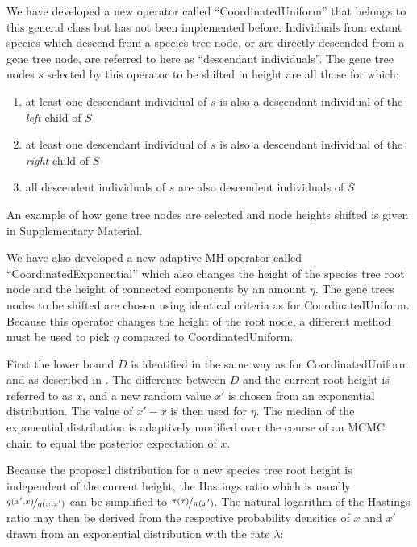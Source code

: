 \documentclass[nogrid]{MBE}%
\begin{document}
We have developed a new operator called ``CoordinatedUniform'' that belongs to
this general class but has not been implemented before. Individuals from
extant species which descend from a species tree node, or are directly
descended from a gene tree node, are referred to here as ``descendant
individuals''. The gene tree nodes ${s}$ selected by this operator to be
shifted in height are all those for which:

\begin{enumerate}
\item at least one descendant individual of $s$ is also a
descendant individual of the \textit{left} child of $S$
\item at least one descendant individual of $s$ is also a
descendant individual of the \textit{right} child of $S$
\item all descendent individuals of $s$ are also
descendent individuals of $S$
\end{enumerate}

An example of how gene tree nodes are selected and node heights shifted is
given in Supplementary Material.

We have also developed a new adaptive MH \citep{Andrieu2008} operator called
``CoordinatedExponential'' which also changes the height of the species tree
root node and the height of connected components by an amount $\eta$. The gene
trees nodes to be shifted are chosen using identical criteria as for
CoordinatedUniform. Because this operator changes the height of the root node,
a different method must be used to pick $\eta$ compared to CoordinatedUniform.

First the lower bound $D$ is identified in the same way as for
CoordinatedUniform and as described in \cite{Jones2016}. The difference
between $D$ and the current root height is referred to as $x$, and a new
random value $x'$ is chosen from an exponential distribution. The value of $x'
- x$ is then used for $\eta$. The median of the exponential distribution is
adaptively modified over the course of an MCMC chain to equal the posterior
expectation of $x$.

Because the proposal distribution for a new species tree root height is
independent of the current height, the Hastings ratio which is usually
$\nicefrac{q(x',x)}{q(x,x')}$ \citep{Hastings1970} can be simplified to
$\nicefrac{\pi(x)}{\pi(x')}$. The natural logarithm of the Hastings ratio may then
be derived from the respective probability densities of $x$ and
$x'$ drawn from an exponential distribution with the rate $\lambda$:
\end{document}
